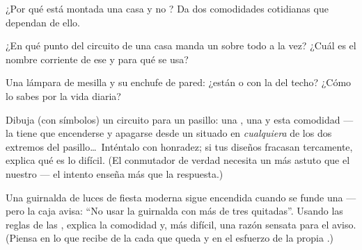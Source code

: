 \begin{exercise}[$\star$]\label{exo:g5:series-parallel-circuits:6}
¿Por qué está montada una casa  y no ? Da dos
comodidades cotidianas que dependan de ello.
\end{exercise}

\begin{exercise}[$\star$]\label{exo:g5:series-parallel-circuits:7}
¿En qué punto del circuito de una casa manda un  sobre
todo a la vez? ¿Cuál es el nombre corriente de ese  y
para qué se usa?
\end{exercise}

\begin{exercise}[$\star$]\label{exo:g5:series-parallel-circuits:8}
Una lámpara de mesilla y su enchufe de pared: ¿están  o
 con la  del techo? ¿Cómo lo sabes por la vida
diaria?
\end{exercise}

\begin{exercise}[$\star\star$]\label{exo:g5:series-parallel-circuits:9}
Dibuja (con símbolos) un circuito para un pasillo: una , una
 y esta comodidad --- la  tiene que encenderse y
apagarse desde un  situado en \emph{cualquiera} de los dos
extremos del pasillo\dots\ Inténtalo con honradez; si tus diseños
fracasan tercamente, explica qué es lo difícil. (El conmutador de
verdad necesita un  más astuto que el nuestro --- el
intento enseña más que la respuesta.)
\end{exercise}

\begin{exercise}[$\star\star$]\label{exo:g5:series-parallel-circuits:10}
Una guirnalda de luces de fiesta moderna sigue encendida cuando se
funde una  --- pero la caja avisa: ``No usar la guirnalda con
más de tres  quitadas''. Usando las reglas de las ,
explica la comodidad y, más difícil, una razón sensata para el aviso.
(Piensa en lo que recibe de la  cada  que queda y en el
esfuerzo de la propia .)
\end{exercise}

